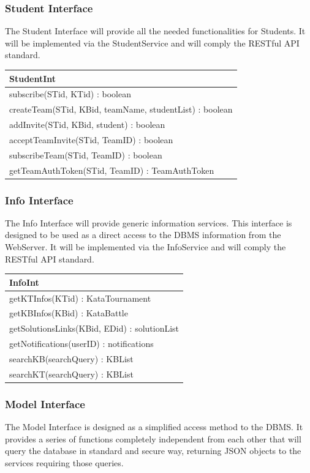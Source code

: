 \documentclass[11pt]{report}
\begin{document}
\cleardoublepage
\subsubsection{Student Interface}
The Student Interface will provide all the needed functionalities for Students.
It will be implemented via the StudentService and will comply the RESTful API standard.

\begin{longtable}[h] {|p{130mm}|}
\hline
\textbf{StudentInt} \\ \hline
subscribe(STid, KTid) : boolean \\
createTeam(STid, KBid, teamName, studentList) : boolean \\
addInvite(STid, KBid, student) : boolean\\
acceptTeamInvite(STid, TeamID) : boolean \\
subscribeTeam(STid, TeamID) : boolean \\
getTeamAuthToken(STid, TeamID) : TeamAuthToken \\
\hline
\end{longtable}

\subsubsection{Info Interface}
The Info Interface will provide generic information services.
This interface is designed to be used as a direct access to the DBMS information from the WebServer.
It will be implemented via the InfoService and will comply the RESTful API standard.

\begin{longtable}[h] {|p{130mm}|}
\hline
\textbf{InfoInt} \\ \hline
getKTInfos(KTid) : KataTournament \\
getKBInfos(KBid) : KataBattle \\
getSolutionsLinks(KBid, EDid) : solutionList \\
getNotifications(userID) : notifications\\
searchKB(searchQuery) : KBList \\
searchKT(searchQuery) : KBList \\
\hline
\end{longtable}

\subsubsection{Model Interface}
The Model Interface is designed as a simplified access method to the DBMS\@.
It provides a series of functions completely independent from each other that will
query the database in standard and secure way, returning JSON objects to the services requiring those queries.
\end{document}
